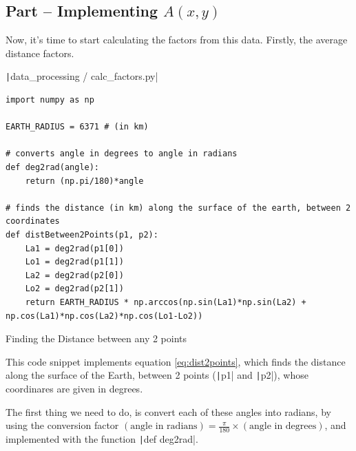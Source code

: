 \documentclass[12pt]{report}
\newcommand{\pil}[1]{\protect\texttt|#1|}
\begin{document}
\subsection{Part \theparts{} -- Implementing $A\left(x,y\right)$}\label{sec:aofxyImplementation}
Now, it's time to start calculating the factors from this data. Firstly, the average distance factors.

\begin{listing}[H]
\pil{data_processing / calc_factors.py}
\begin{verbatim}
import numpy as np

EARTH_RADIUS = 6371 # (in km)

# converts angle in degrees to angle in radians
def deg2rad(angle):
    return (np.pi/180)*angle

# finds the distance (in km) along the surface of the earth, between 2 coordinates
def distBetween2Points(p1, p2):
    La1 = deg2rad(p1[0])
    Lo1 = deg2rad(p1[1])
    La2 = deg2rad(p2[0])
    Lo2 = deg2rad(p2[1])
    return EARTH_RADIUS * np.arccos(np.sin(La1)*np.sin(La2) + np.cos(La1)*np.cos(La2)*np.cos(Lo1-Lo2))
\end{verbatim}
\caption{Finding the Distance between any 2 points}\label{cs:dist2points}
\end{listing}

This code snippet implements equation \ref{eq:dist2points}, which finds the distance along the surface of the Earth, between 2 points (\pil{p1} and \pil{p2}), whose coordinares are given in degrees.

The first thing we need to do, is convert each of these angles into radians, by using the conversion factor $\left(\text{angle in radians}\right)=\frac{\pi}{180}\times\left(\text{angle in degrees}\right)$, and implemented with the function \pil{def deg2rad}.

\begin{center}
\end{center}
\end{document}
